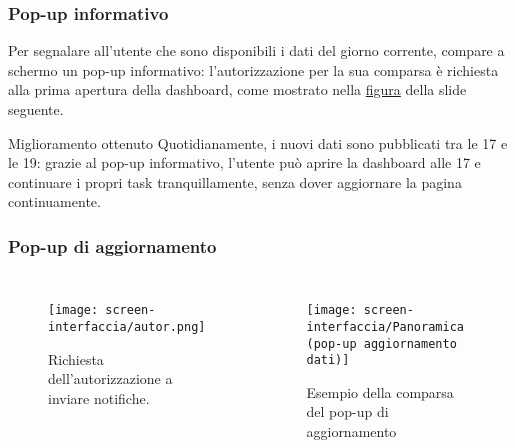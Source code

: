 \begin{frame}
    \frametitle{Pop-up informativo}
    \label{f:pop}
    Per segnalare all'utente che sono disponibili i dati del giorno corrente, compare a schermo un pop-up informativo: l'autorizzazione per la sua comparsa è richiesta alla prima apertura della dashboard, come mostrato nella \hyperlink{fig:autoriz}{figura} della slide seguente.
    \vspace{-30pt}
    \begin{alertblock}{Miglioramento ottenuto}
        Quotidianamente, i nuovi dati sono pubblicati tra le 17 e le 19: grazie al pop-up informativo, l'utente può aprire la dashboard alle 17 e continuare i propri task tranquillamente, senza dover aggiornare la pagina continuamente.       
    \end{alertblock}

\end{frame}

\begin{frame}
    \frametitle{Pop-up di aggiornamento}

    \begin{columns}
        
        \begin{figure}
            \centering
            \texttt{[image: screen-interfaccia/autor.png]}
            \caption{Richiesta dell'autorizzazione a inviare notifiche.}
            \label{fig:autoriz}
        \end{figure}

        \begin{figure}
            \centering
            \texttt{[image: screen-interfaccia/Panoramica (pop-up aggiornamento dati)]}
            \caption{Esempio della comparsa del pop-up di aggiornamento}
        \end{figure}

    \end{columns}

    

\end{frame}